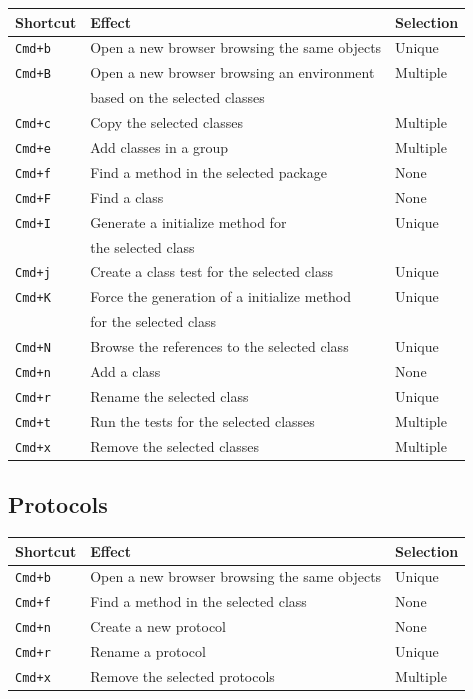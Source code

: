 \documentclass[a4paper,10pt,twoside]{book}
\begin{document}
\begin{tabular}{l | l | l}
Shortcut & Effect & Selection\\
\hline
\hline
\verb?Cmd+b? & Open a new browser browsing the same objects & Unique\\
\hline
\verb?Cmd+B?& Open a new browser browsing an environment & Multiple\\
 &based on the selected classes & \\
\hline
\verb?Cmd+c?& Copy the selected classes & Multiple \\
\hline
\verb?Cmd+e?& Add classes in a group & Multiple \\
\hline
\verb?Cmd+f?& Find a method in the selected package & None \\
\hline
\verb?Cmd+F?& Find a class & None \\
\hline
\verb?Cmd+I?& Generate a initialize method for & Unique \\
&the selected class&\\
\hline
\verb?Cmd+j?& Create a class test for the selected class & Unique \\
\hline
\verb?Cmd+K?& Force the generation of a initialize method & Unique \\
&for the selected class &\\
\hline
\verb?Cmd+N?& Browse the references to the selected class & Unique \\
\hline
\verb?Cmd+n?& Add a class & None \\
\hline
\verb?Cmd+r?& Rename the selected class & Unique \\
\hline
\verb?Cmd+t?& Run the tests for the selected classes & Multiple \\
\hline
\verb?Cmd+x?& Remove the selected classes & Multiple \\
\hline
\end{tabular}

\subsection{Protocols}


\begin{tabular}{l | l | l}
Shortcut & Effect & Selection\\
\hline
\hline
\verb?Cmd+b? & Open a new browser browsing the same objects & Unique\\
\hline
\verb?Cmd+f? & Find a method in the selected class & None\\
\hline
\verb?Cmd+n? & Create a new protocol & None\\
\hline
\verb?Cmd+r? & Rename a protocol & Unique\\
\hline
\verb?Cmd+x? & Remove the selected protocols & Multiple\\
\hline
\end{tabular}
\end{document}
